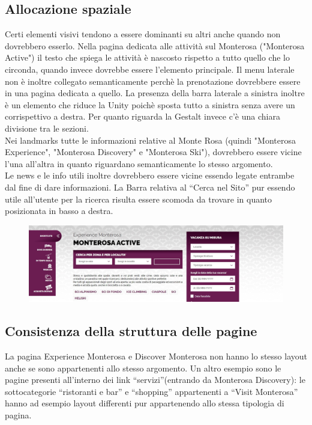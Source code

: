         \subsection{Allocazione spaziale}
        Certi elementi visivi tendono a essere dominanti su altri anche quando
        non dovrebbero esserlo. Nella pagina dedicata alle attività sul
        Monterosa ("Monterosa Active") il testo che spiega le attività è
        nascosto rispetto a tutto quello che lo circonda, quando invece dovrebbe
        essere l’elemento principale. Il menu laterale non è inoltre collegato
        semanticamente perchè la prenotazione dovrebbere essere in una pagina
        dedicata a quello. La presenza della barra laterale a sinistra inoltre è
        un elemento che riduce la Unity poichè sposta tutto a sinistra senza
        avere un corrispettivo a destra. Per quanto riguarda la Gestalt invece
        c’è una chiara divisione tra le sezioni.\\ 
        Nei landmarks tutte le informazioni relative al Monte Rosa (quindi "Monterosa
        Experience", "Monterosa Discovery" e "Monterosa Ski"), dovrebbero essere vicine 
        l'una all'altra in quanto riguardano semanticamente lo stesso argomento.\\
        Le news e le info utili inoltre dovrebbero essere vicine essendo legate
        entrambe dal fine di dare informazioni. La Barra relativa al “Cerca nel
        Sito” pur essendo utile all'utente per la ricerca risulta essere scomoda
        da trovare in quanto posizionata in basso a destra.
        \begin{figure}[H]
            \centering 
            \includegraphics[scale=0.3]{resources/images/spatialAllocationFinal.jpg}
        \end{figure}
        
        \subsection{Consistenza della struttura delle pagine}
        La pagina Experience Monterosa e Discover Monterosa non hanno lo stesso
        layout anche se sono appartenenti allo stesso argomento. Un altro
        esempio sono le pagine presenti all'interno  dei link “servizi”(entrando
        da Monterosa Discovery): le sottocategorie “ristoranti e bar” e
        “shopping” appartenenti a “Visit Monterosa” hanno ad esempio layout
        differenti pur appartenendo allo stessa tipologia di pagina.